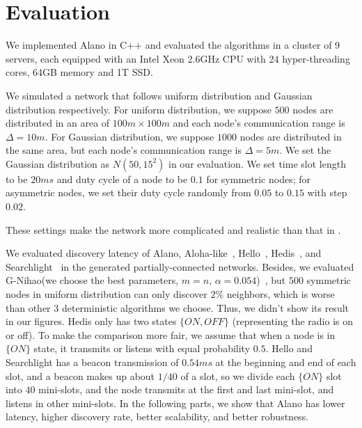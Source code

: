 \section{Evaluation}
\label{Evaluation}


We implemented Alano in C++ and evaluated the algorithms in a cluster of 9 servers,
each equipped with an Intel Xeon 2.6GHz CPU with 24 hyper-threading cores, 64GB memory and 1T SSD.

We simulated a network that follows uniform distribution and Gaussian distribution respectively.
For uniform distribution, we suppose $500$ nodes are distributed in an area of $100m \times 100m$ and each node's communication range is $\Delta = 10m$. For Gaussian distribution, we suppose $1000$ nodes are distributed in the same area, but each node's communication range is $\Delta = 5m$. We set the Gaussian distribution as $N(50,15^2)$ in our evaluation.
We set time slot length to be $20ms$ and duty cycle of a node to be $0.1$ for symmetric nodes; for asymmetric nodes, we set their duty cycle randomly from $0.05$ to $0.15$ with step $0.02$.

These settings make the network more complicated and realistic than that in
\cite{wang2015blinddate, qiu2016talk, sun2014hello, bakht2012searchlight,
chen2015heterogeneous, kandhalu2010u, you2011aloha,
mcglynn2001birthday, song2014probabilistic, vasudevan2009neighbor}.



We evaluated discovery latency of Alano, Aloha-like~\cite{you2011aloha}, Hello~\cite{sun2014hello}, Hedis~\cite{chen2015heterogeneous}, and Searchlight~\cite{bakht2012searchlight} in the generated partially-connected networks. Besides, we evaluated G-Nihao(we choose the best parameters, $m=n$, $\alpha=0.054$)~\cite{qiu2016talk}, but $500$ symmetric nodes in uniform distribution can only discover $2\%$ neighbors, which is worse than other $3$ deterministic algorithms we choose. Thus, we didn't show its result in our figures.
Hedis only has two states $\{ON, OFF\}$ (representing the radio is on or off). To make the comparison more fair, we assume that when a node is in $\{ON\}$ state, it transmits or listens with equal probability $0.5$. Hello and Searchlight has a beacon transmission of $0.54ms$ at the beginning and end of each slot, and a beacon makes up about $1/40$ of a slot, so we divide each $\{ON\}$ slot into $40$ mini-slots, and the node transmits at the first and last mini-slot, and listens in other mini-slots.
In the following parts, we show that Alano has lower latency, higher discovery rate, better scalability, and better robustness.


